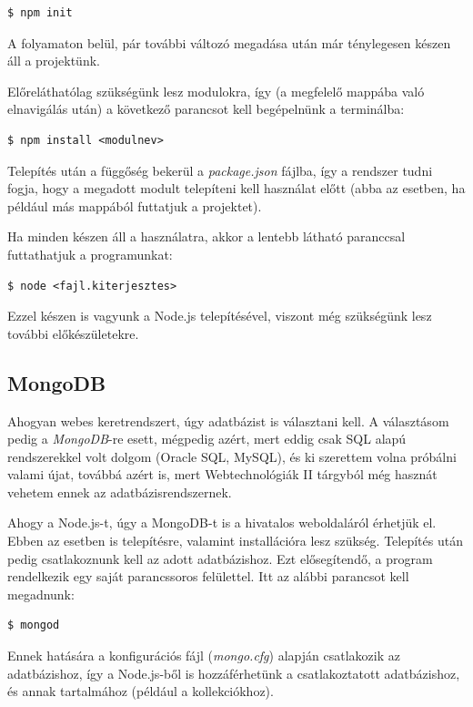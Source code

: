 \begin{verbatim}
$ npm init
\end{verbatim}

A folyamaton belül, pár további változó megadása után már ténylegesen készen áll a projektünk.

Előreláthatólag szükségünk lesz modulokra, így (a megfelelő mappába való elnavigálás után) a következő parancsot kell begépelnünk a terminálba:

\begin{verbatim}
$ npm install <modulnev>
\end{verbatim}

Telepítés után a függőség bekerül a \textit{package.json} fájlba, így a rendszer tudni fogja, hogy a megadott modult telepíteni kell használat előtt (abba az esetben, ha például más mappából futtatjuk a projektet).

Ha minden készen áll a használatra, akkor a lentebb látható paranccsal futtathatjuk a programunkat:

\begin{verbatim}
$ node <fajl.kiterjesztes>
\end{verbatim}

Ezzel készen is vagyunk a Node.js telepítésével, viszont még szükségünk lesz további előkészületekre.

\subsection{MongoDB}

Ahogyan webes keretrendszert, úgy adatbázist is választani kell. A választásom pedig a \textit{MongoDB}-re esett, mégpedig azért, mert eddig csak SQL alapú rendszerekkel volt dolgom (Oracle SQL, MySQL), és ki szerettem volna próbálni valami újat, továbbá azért is, mert Webtechnológiák II tárgyból még hasznát vehetem ennek az adatbázisrendszernek.

Ahogy a Node.js-t, úgy a MongoDB-t is a hivatalos weboldaláról érhetjük el. Ebben az esetben is telepítésre, valamint installációra lesz szükség. Telepítés után pedig csatlakoznunk kell az adott adatbázishoz. Ezt elősegítendő, a program rendelkezik egy saját parancssoros felülettel. Itt az alábbi parancsot kell megadnunk:

\begin{verbatim}
$ mongod
\end{verbatim}

Ennek hatására a konfigurációs fájl (\textit{mongo.cfg}) alapján csatlakozik az adatbázishoz, így a Node.js-ből is hozzáférhetünk a csatlakoztatott adatbázishoz, és annak tartalmához (például a kollekciókhoz).

